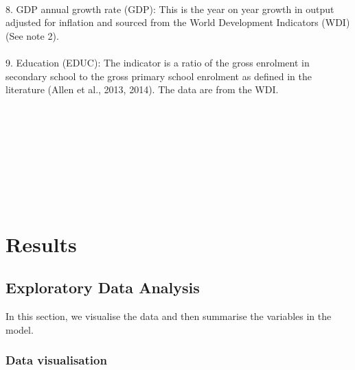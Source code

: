 \documentclass[a4paper, nobind]{templates/ociamthesis}
\begin{document}
\begin{landscape}
\begin{table}
\begin{tabu}
\\
8. GDP annual growth rate (GDP): This is the year on year growth in output adjusted for inflation and sourced from the World Development Indicators (WDI) (See note 2).\\
\addlinespace
\\
9. Education (EDUC): The indicator is a ratio of the gross enrolment in secondary school to the gross primary school enrolment as defined in the literature (Allen et al., 2013, 2014). The data are from the WDI.\\
\\
\bottomrule
{}\\
\\
\\
\\
\\
\\
\\
\end{tabu}
\end{table}
\end{landscape}

\hypertarget{results}{%
\section{Results}\label{results}}

\hypertarget{exploratory-data-analysis}{%
\subsection{Exploratory Data Analysis}\label{exploratory-data-analysis}}

In this section, we visualise the data and then summarise the variables in the model.

\hypertarget{data-visualisation}{%
\subsubsection{Data visualisation}\label{data-visualisation}}
\end{document}
